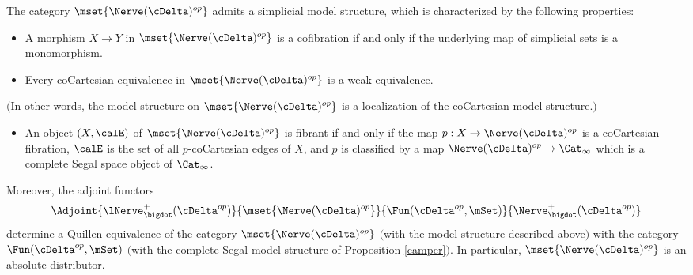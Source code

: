 \begin{proposition}\label{camperr}
The category $\mset{ \Nerve( \cDelta)^{op} }$ admits a simplicial model structure, which is
characterized by the following properties:
\begin{itemize}
\item[$(C)$] A morphism $\overline{X} \rightarrow \overline{Y}$ in $\mset{ \Nerve(\cDelta)^{op} }$
is a cofibration if and only if the underlying map of simplicial sets is a monomorphism.

\item[$(W)$] Every coCartesian equivalence in $\mset{ \Nerve(\cDelta)^{op} }$ is a
weak equivalence.
\end{itemize}
$($In other words, the model structure on $\mset{ \Nerve(\cDelta)^{op} }$ is a localization
of the coCartesian model structure.$)$
\begin{itemize}
\item[$(F)$] An object $(X, \calE)$ of $\mset{ \Nerve(\cDelta)^{op} }$ is
fibrant if and only if the map $p: X \rightarrow \Nerve(\cDelta)^{op}$ is a coCartesian fibration,
$\calE$ is the set of all $p$-coCartesian edges of $X$, and $p$ is classified by a map
$\Nerve(\cDelta)^{op} \rightarrow \Cat_{\infty}$ which is a complete Segal space object
of $\Cat_{\infty}$.
\end{itemize}
Moreover, the adjoint functors
$$ \Adjoint{ \lNerve^{+}_{\bigdot}( \cDelta^{op}) }{ \mset{ \Nerve(\cDelta)^{op} }}{
\Fun( \cDelta^{op}, \mSet)}{\Nerve_{\bigdot}^{+}( \cDelta^{op})}$$
determine a Quillen equivalence of the category $\mset{ \Nerve(\cDelta)^{op} }$ 
$($with the model structure described above$)$ with the category $\Fun( \cDelta^{op}, \mSet)$
$($with the complete Segal model structure of Proposition \ref{camper}$)$.
In particular, $\mset{ \Nerve(\cDelta)^{op} }$ is an absolute distributor.
\end{proposition}

